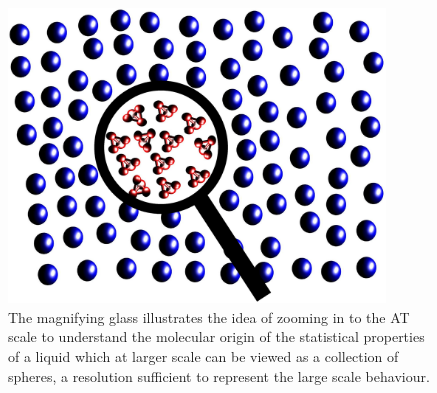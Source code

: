 \documentclass[aps,pre,preprint]{revtex4}
\begin{document}
\begin{figure}
  \centering
  \includegraphics[angle=0,width=10cm]{zoom.eps}
  \caption{The magnifying glass illustrates the idea of zooming in to the AT scale to understand the molecular origin of the statistical properties of a liquid which at larger scale can be viewed as a collection of spheres, a resolution sufficient to represent the large scale behaviour.}
  \label{zoom}
\end{figure} 
\end{document}
